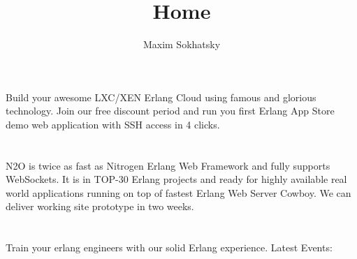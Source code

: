 \documentclass[11pt]{article}
\begin{document}

\title{Home}
\author{Maxim Sokhatsky}



\section*{}
\paragraph{}
Build your awesome LXC/XEN Erlang Cloud using famous  and glorious  technology.
Join our free discount period and run you first Erlang App Store demo web application with SSH access in 4 clicks.

\section*{}
\paragraph{}
N2O is twice as fast as Nitrogen Erlang Web Framework and fully supports WebSockets.
It is in TOP-30 Erlang projects and ready for highly available real world applications running on top of fastest Erlang Web Server Cowboy.
We can deliver working site prototype in two weeks.

\section*{}
\paragraph{}
Train your erlang engineers with our solid Erlang experience.
Latest Events:
\end{document}
